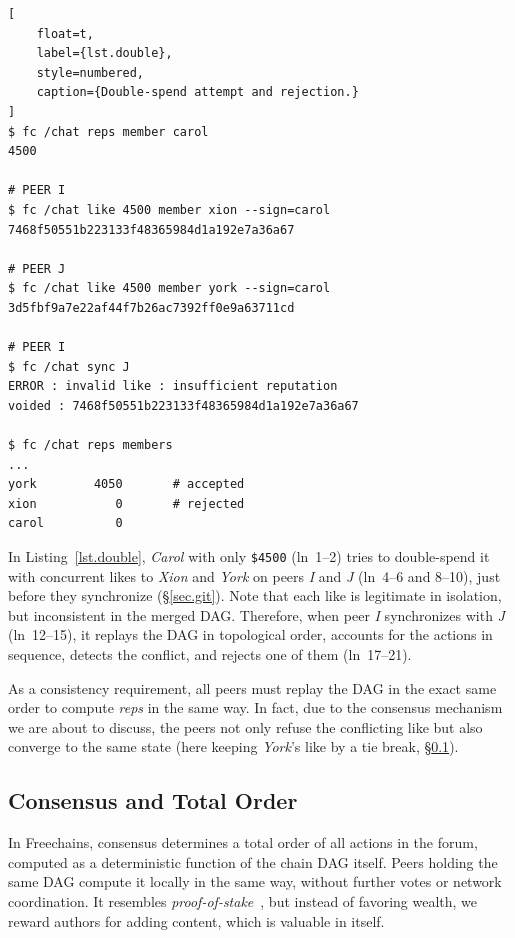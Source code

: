 \documentclass[10pt,twocolumn]{article}
\newcommand{\FC}       {Freechains\xspace}
\newcommand{\reps}     {\emph{reps}\xspace}
\newcommand{\nreps}[1] {\code{\$#1\xspace}}
\newcommand{\code}[1]  {\texttt{\small{#1}}}
\begin{document}
\begin{lstlisting}[
    float=t,
    label={lst.double},
    style=numbered,
    caption={Double-spend attempt and rejection.}
]
$ fc /chat reps member carol
4500

# PEER I
$ fc /chat like 4500 member xion --sign=carol
7468f50551b223133f48365984d1a192e7a36a67

# PEER J
$ fc /chat like 4500 member york --sign=carol
3d5fbf9a7e22af44f7b26ac7392ff0e9a63711cd

# PEER I
$ fc /chat sync J
ERROR : invalid like : insufficient reputation
voided : 7468f50551b223133f48365984d1a192e7a36a67

$ fc /chat reps members
...
york        4050       # accepted
xion           0       # rejected
carol          0
\end{lstlisting}

In Listing~\ref{lst.double}, \emph{Carol} with only \nreps{4500} (ln~1--2)
tries to double-spend it with concurrent likes to \emph{Xion} and \emph{York}
on peers \emph{I} and \emph{J} (ln~4--6 and 8--10), just before they
synchronize (\S\ref{sec.git}).
%
Note that each like is legitimate in isolation, but inconsistent in the merged
DAG.
Therefore, when peer \emph{I} synchronizes with \emph{J} (ln~12--15), it
replays the DAG in topological order, accounts for the actions in sequence,
detects the conflict, and rejects one of them (ln~17--21).

As a consistency requirement, all peers must replay the DAG in the exact same
order to compute \reps in the same way.
In fact, due to the consensus mechanism we are about to discuss, the peers not
only refuse the conflicting like but also converge to the same state (here
keeping \emph{York}'s like by a tie break, \S\ref{sec.design.consensus}).

\subsection{Consensus and Total Order}
\label{sec.design.consensus}

In \FC, consensus determines a total order of all actions in the forum,
computed as a deterministic function of the chain DAG itself.
Peers holding the same DAG compute it locally in the same way, without
further votes or network coordination.
%
It resembles \emph{proof-of-stake}~\cite{pos.ouroboros,pos.weak}, but instead
of favoring wealth, we reward authors for adding content, which is valuable in
itself.
\end{document}
